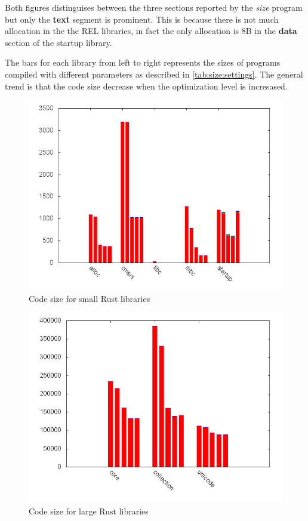 Both figures distinguises between the three sections reported by the \emph{size} program but only the \textbf{text} segment is prominent.
This is because there is not much allocation in the the REL libraries, in fact the only allocation is 8B in the \textbf{data} section of the startup library.

The bars for each library from left to right represents the sizes of programs compiled with different parameters as described in \autoref{tab:size:settings}.
The general trend is that the code size decrease when the optimization level is incresased.

\begin{figure}[H]
  \begin{center}
    \includegraphics[scale=0.3]{results/plots/size/lib/small/size.png}
  \end{center}
  \caption{Code size for small Rust libraries}
  \label{fig:size:lib:small}
\end{figure}
\begin{figure}[H]
  \begin{center}
    \includegraphics[scale=0.3]{results/plots/size/lib/large/size.png}
  \end{center}
  \caption{Code size for large Rust libraries}
  \label{fig:size:lib:large}
\end{figure}

